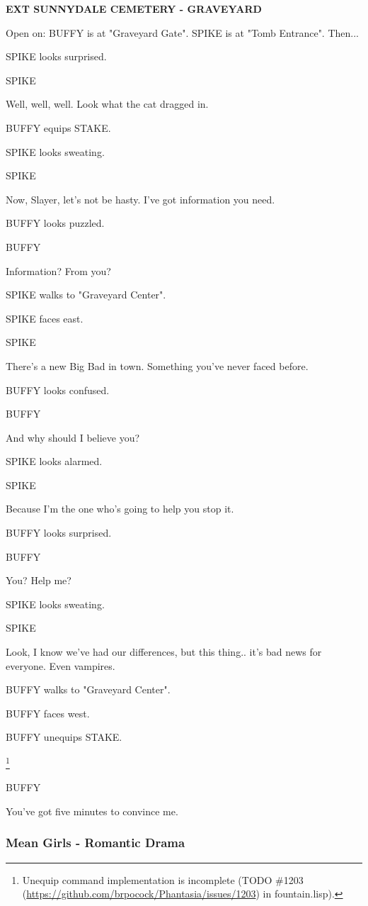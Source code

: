 \documentclass[11pt,letterpaper,oldstylefigures]{memoir}
\newcommand{\slugline}[1]{\nobreak\textbf{\MakeUppercase{#1}}\par\nobreak\vspace{1\baselineskip}}
\newcommand{\speaker}[1]{\nobreak\hspace*{0.333\textwidth}\MakeUppercase{#1}\par\nobreak\vspace{0.5\baselineskip}}
\newcommand{\dialogue}[1]{\nobreak\hspace*{0.25\textwidth}\begin{minipage}{0.5\textwidth}#1\end{minipage}\par\vspace{1\baselineskip}}
\newcommand{\stagedir}[1]{#1\par\vspace{1\baselineskip}}
\newenvironment{FountainExample}
  {\begingroup
  \ttfamily\small
   \setlength{\parindent}{0pt}
  \setlength{\parskip}{0.5em}
  \allowdisplaybreaks
  \setlength{\displaywidowpenalty}{0}
  \setlength{\widowpenalty}{0}
  \setlength{\clubpenalty}{0}
  \setlength{\interlinepenalty}{0}
}
  {\endgroup}
\begin{document}
\begin{FountainExample}
\slugline{EXT SUNNYDALE CEMETERY - GRAVEYARD}

\stagedir{Open on: BUFFY is at "Graveyard Gate". SPIKE is at "Tomb Entrance". Then...}

\stagedir{SPIKE looks surprised.}

\speaker{SPIKE}
\dialogue{Well, well, well. Look what the cat dragged in.}

\stagedir{BUFFY equips STAKE.}

\stagedir{SPIKE looks sweating.}

\speaker{SPIKE}
\dialogue{Now, Slayer, let's not be hasty. I've got information you need.}

\stagedir{BUFFY looks puzzled.}

\speaker{BUFFY}
\dialogue{Information? From you?}

\stagedir{SPIKE walks to "Graveyard Center".}

\stagedir{SPIKE faces east.}

\speaker{SPIKE}
\dialogue{There's a new Big Bad in town. Something you've never faced before.}

\stagedir{BUFFY looks confused.}

\speaker{BUFFY}
\dialogue{And why should I believe you?}

\stagedir{SPIKE looks alarmed.}

\speaker{SPIKE}
\dialogue{Because I'm the one who's going to help you stop it.}

\stagedir{BUFFY looks surprised.}

\speaker{BUFFY}
\dialogue{You? Help me?}

\stagedir{SPIKE looks sweating.}

\speaker{SPIKE}
\dialogue{Look, I know we've had our differences, but this thing.. it's bad news for everyone. Even vampires.}

\stagedir{BUFFY walks to "Graveyard Center".}

\stagedir{BUFFY faces west.}

\stagedir{BUFFY unequips STAKE.}\footnote{Unequip command implementation is incomplete (TODO \#1203 (\href{https://github.com/brpocock/Phantasia/issues/1203}{https://github.com/brpocock/Phantasia/issues/1203}) in fountain.lisp).}

\speaker{BUFFY}
\dialogue{You've got five minutes to convince me.}
\end{FountainExample}

\subsubsection*{Mean Girls - Romantic Drama}
\label{ex:mean-girls-romantic-drama}
\end{document}
